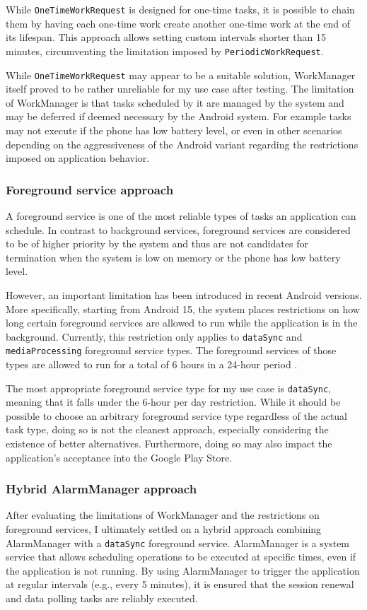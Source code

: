 While \texttt{OneTimeWorkRequest} is designed for one-time tasks, it is possible to chain them by having each one-time work create another one-time work at the end of its lifespan. This approach allows setting custom intervals shorter than 15 minutes, circumventing the limitation imposed by \texttt{PeriodicWorkRequest}.

While \texttt{OneTimeWorkRequest} may appear to be a suitable solution, WorkManager itself proved to be rather unreliable for my use case after testing. The limitation of WorkManager is that tasks scheduled by it are managed by the system and may be deferred if deemed necessary by the Android system. For example tasks may not execute if the phone has low battery level, or even in other scenarios depending on the aggressiveness of the Android variant regarding the restrictions imposed on application behavior.

\subsubsection{Foreground service approach}
A foreground service is one of the most reliable types of tasks an application can schedule. In contrast to background services, foreground services are considered to be of higher priority by the system and thus are not candidates for termination when the system is low on memory or the phone has low battery level.

However, an important limitation has been introduced in recent Android versions. More specifically, starting from Android 15, the system places restrictions on how long certain foreground services are allowed to run while the application is in the background. Currently, this restriction only applies to \texttt{dataSync} and \texttt{mediaProcessing} foreground service types. The foreground services of those types are allowed to run for a total of 6 hours in a 24-hour period \cite{android-15-datasync-timeout}.

The most appropriate foreground service type for my use case is \texttt{dataSync}, meaning that it falls under the 6-hour per day restriction. While it should be possible to choose an arbitrary foreground service type regardless of the actual task type, doing so is not the cleanest approach, especially considering the existence of better alternatives. Furthermore, doing so may also impact the application's acceptance into the Google Play Store.

\subsubsection{Hybrid AlarmManager approach}
\label{alarmmanager-approach}
After evaluating the limitations of WorkManager and the restrictions on foreground services, I ultimately settled on a hybrid approach combining AlarmManager with a \texttt{dataSync} foreground service. AlarmManager is a system service that allows scheduling operations to be executed at specific times, even if the application is not running. By using AlarmManager to trigger the application at regular intervals (e.g., every 5 minutes), it is ensured that the session renewal and data polling tasks are reliably executed.

